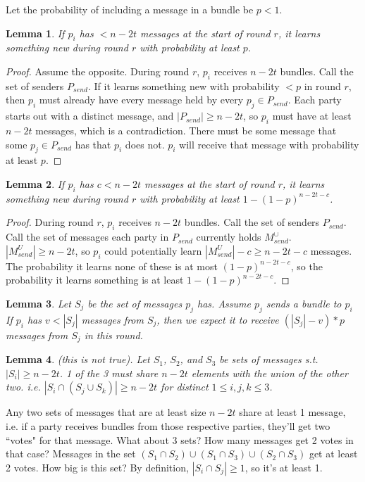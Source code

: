 \documentclass{article}
\newtheorem{lemma}{Lemma}
\begin{document}
Let the probability of including a message in a bundle be $p < 1$.
\begin{lemma}
If $p_i$ has $< n - 2t$ messages at the start of round $r$, it learns something new during round $r$ with probability at least $p$.
\end{lemma}
\begin{proof}
Assume the opposite. During round $r$, $p_i$ receives $n - 2t$ bundles. Call the set of senders $P_{send}$. If it learns something new with probability $< p$ in round $r$, then $p_i$ must already have every message held by every $p_j \in P_{send}$. Each party starts out with a distinct message, and $|P_{send}| \geq n - 2t$, so $p_i$ must have at least $n -2t$ messages, which is a contradiction. There must be some message that some $p_j \in P_{send}$ has that $p_i$ does not. $p_i$ will receive that message with probability at least $p$.
\end{proof}
\begin{lemma}
If $p_i$ has $c < n - 2t$ messages at the start of round $r$, it learns something new during round $r$ with probability at least $1 - (1 - p)^{n - 2t - c}$.
\end{lemma}
\begin{proof}
During round $r$, $p_i$ receives $n - 2t$ bundles. Call the set of senders $P_{send}$. Call the set of messages each party in $P_{send}$ currently holds $M_{send}^\cup$. $|M^U_{send}| \geq n - 2t$, so $p_i$ could potentially learn $|M^U_{send}| - c \geq n - 2t - c$ messages. The probability it learns none of these is at most $(1 - p)^{n - 2t - c}$, so the probability it learns something is at least $1 - (1 - p)^{n - 2t - c}$.
\end{proof}

\begin{lemma}
Let $S_j$ be the set of messages $p_j$ has. Assume $p_j$ sends a bundle to $p_i$ If $p_i$ has $v < |S_j|$ messages from $S_j$, then we expect it to receive $(|S_j| - v) * p$ messages from $S_j$ in this round.
\end{lemma}

\begin{lemma}
(this is not true). Let $S_1$, $S_2$, and $S_3$ be sets of messages s.t. $|S_i| \geq n - 2t$. 1 of the 3 must share $n - 2t$ elements with the union of the other two. i.e. $|S_i \cap (S_j \cup S_k)| \geq n - 2t$ for distinct $1 \leq i, j, k \leq 3$.
\end{lemma}

Any two sets of messages that are at least size $n - 2t$ share at least 1 message, i.e. if a party receives bundles from those respective parties, they'll get two ``votes" for that message. What about 3 sets? How many messages get 2 votes in that case? Messages in the set $(S_1 \cap S_2) \cup (S_1 \cap S_3) \cup (S_2 \cap S_3)$ get at least 2 votes. How big is this set? By definition, $|S_i \cap S_j| \geq 1$, so it's at least 1. 
\end{document}
